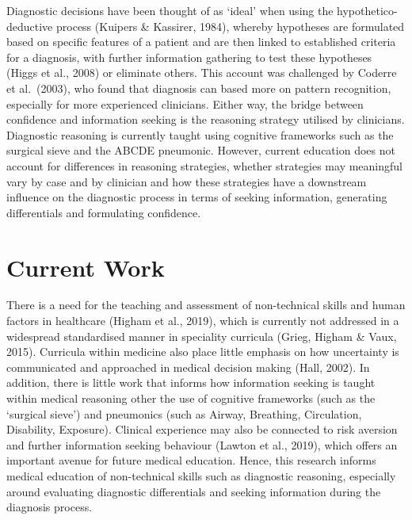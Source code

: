 \documentclass[a4paper, nobind]{templates/ociamthesis}
\begin{document}
Diagnostic decisions have been thought of as `ideal' when using the hypothetico-deductive process (Kuipers \& Kassirer, 1984), whereby hypotheses are formulated based on specific features of a patient and are then linked to established criteria for a diagnosis, with further information gathering to test these hypotheses (Higgs et al., 2008) or eliminate others. This account was challenged by Coderre et al.~(2003), who found that diagnosis can based more on pattern recognition, especially for more experienced clinicians. Either way, the bridge between confidence and information seeking is the reasoning strategy utilised by clinicians. Diagnostic reasoning is currently taught using cognitive frameworks such as the surgical sieve and the ABCDE pneumonic. However, current education does not account for differences in reasoning strategies, whether strategies may meaningful vary by case and by clinician and how these strategies have a downstream influence on the diagnostic process in terms of seeking information, generating differentials and formulating confidence.

\section*{Current Work}\label{current-work}

There is a need for the teaching and assessment of non-technical skills and human factors in healthcare (Higham et al., 2019), which is currently not addressed in a widespread standardised manner in speciality curricula (Grieg, Higham \& Vaux, 2015). Curricula within medicine also place little emphasis on how uncertainty is communicated and approached in medical decision making (Hall, 2002). In addition, there is little work that informs how information seeking is taught within medical reasoning other the use of cognitive frameworks (such as the `surgical sieve') and pneumonics (such as Airway, Breathing, Circulation, Disability, Exposure). Clinical experience may also be connected to risk aversion and further information seeking behaviour (Lawton et al., 2019), which offers an important avenue for future medical education. Hence, this research informs medical education of non-technical skills such as diagnostic reasoning, especially around evaluating diagnostic differentials and seeking information during the diagnosis process.
\end{document}

